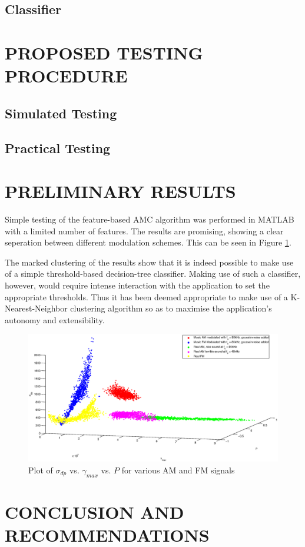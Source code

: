 \documentclass[10pt,twocolumn]{witseiepaper}
\begin{document}
		\subsection{Classifier}


\section{PROPOSED TESTING PROCEDURE}
	\subsection{Simulated Testing}
	\subsection{Practical Testing}

\section{PRELIMINARY RESULTS}
	Simple testing of the feature-based AMC algorithm was performed in MATLAB with a limited number of features. The results are promising, showing a clear seperation between different modulation schemes. This can be seen in Figure \ref{fig:plot0}. 

	The marked clustering of the results show that it is indeed possible to make use of a simple threshold-based decision-tree classifier. Making use of such a classifier, however, would require intense interaction with the application to set the appropriate thresholds. Thus it has been deemed appropriate to make use of a K-Nearest-Neighbor clustering algorithm so as to maximise the application's autonomy and extensibility.

	\begin{figure}[!h]
		\centering
		\includegraphics[width=1.1\textwidth]{plot0.eps}
		\caption{Plot of $\sigma_{dp}$ vs. $\gamma_{max}$ vs. $P$ for various AM and FM signals}
		\label{fig:plot0}
	\end{figure}

\section{CONCLUSION AND RECOMMENDATIONS}



 
\end{document}
